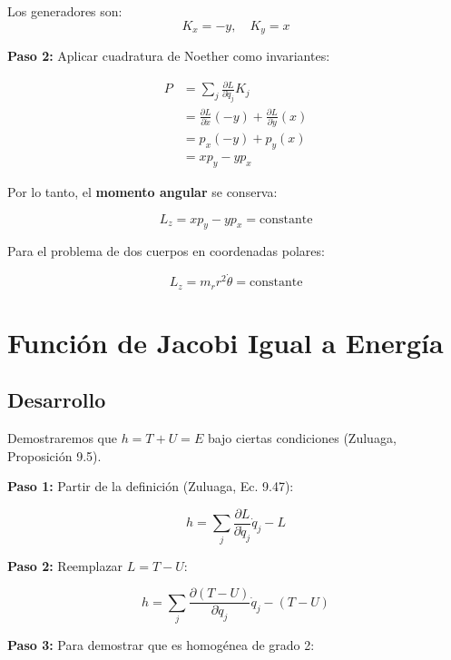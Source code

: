 \documentclass[a4paper]{article}
\begin{document}
Los generadores son:
\begin{equation}
K_x = -y, \quad K_y = x
\end{equation}

\textbf{Paso 2:} Aplicar cuadratura de Noether como invariantes:

\begin{align}
P &= \sum_j \frac{\partial L}{\partial \dot{q}_j}K_j \\
&= \frac{\partial L}{\partial \dot{x}}(-y) + \frac{\partial L}{\partial \dot{y}}(x) \\
&= p_x(-y) + p_y(x) \\
&= xp_y - yp_x
\end{align}

Por lo tanto, el \textbf{momento angular} se conserva:

\begin{equation}
L_z = xp_y - yp_x = \text{constante}
\end{equation}

Para el problema de dos cuerpos en coordenadas polares:

\begin{equation}
L_z = m_r r^2 \dot{\theta} = \text{constante}
\end{equation}

\section{Función de Jacobi Igual a Energía}

\subsection*{Desarrollo}

Demostraremos que $h = T + U = E$ bajo ciertas condiciones (Zuluaga, Proposición 9.5).

\textbf{Paso 1:} Partir de la definición (Zuluaga, Ec. 9.47):

\begin{equation}
h = \sum_j \frac{\partial L}{\partial \dot{q}_j}\dot{q}_j - L
\end{equation}

\textbf{Paso 2:} Reemplazar $L = T - U$:

\begin{equation}
h = \sum_j \frac{\partial (T-U)}{\partial \dot{q}_j}\dot{q}_j - (T-U)
\end{equation}

\textbf{Paso 3:} Para demostrar que es homogénea de grado 2:
\end{document}
